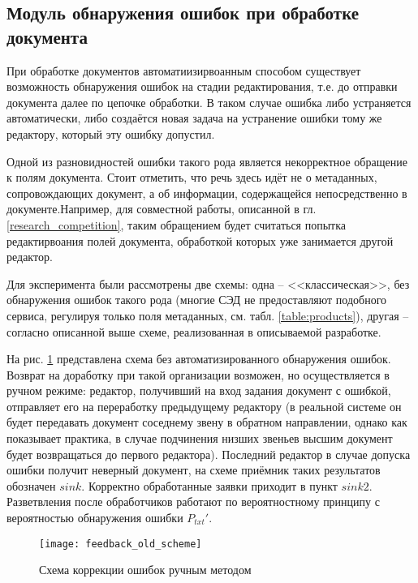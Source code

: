 \subsection{Модуль обнаружения ошибок при обработке документа} \label{research_feedback}

При обработке документов автоматиизирвоанным способом существует возможность обнаружения ошибок на стадии редактирования, т.е. до отправки документа далее по цепочке обработки. В таком случае ошибка либо устраняется автоматически, либо создаётся новая задача на устранение ошибки тому же редактору, который эту ошибку допустил.

\vspace{\baselineskip}
Одной из разновидностей ошибки такого рода является некорректное обращение к полям документа. Стоит отметить, что речь здесь идёт не о метаданных, сопровождающих документ, а об информации, содержащейся непосредственно в документе.Например, для совместной работы, описанной в гл. \ref{research_competition}, таким обращением будет считаться попытка редактирвоания полей документа, обработкой которых уже занимается другой редактор.

\vspace{\baselineskip}
Для эксперимента были рассмотрены две схемы: одна -- <<классическая>>, без обнаружения ошибок такого рода (многие СЭД не предоставляют подобного сервиса, регулируя только поля метаданных, см. табл. \ref{table:products}), другая -- согласно описанной выше схеме, реализованная в описываемой разработке.

\vspace{\baselineskip}
На рис. \ref{img:feedback_old_scheme} представлена схема без автоматизированного обнаружения ошибок. Возврат на доработку при такой организации возможен, но осуществляется в ручном режиме: редактор, получивший на вход задания документ с ошибкой, отправляет его на переработку предыдущему редактору (в реальной системе он будет передавать документ соседнему звену в обратном направлении, однако как показывает практика, в случае подчинения низших звеньев высшим документ будет возвращаться до первого редактора). Последний редактор в случае допуска ошибки получит неверный документ, на схеме приёмник таких результатов обозначен $sink$. Корректно обработанные заявки приходит в пункт $sink2$. Разветвления после обработчиков работают по вероятностному принципу с вероятностью обнаружения ошибки $P_{txt}'$.
 
\begin{figure}[h!]
  \centering
  \texttt{[image: feedback\_old\_scheme]}
  \caption{Схема коррекции ошибок ручным методом}
  \label{img:feedback_old_scheme}
\end{figure}


